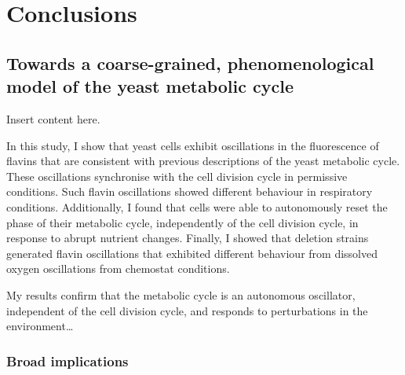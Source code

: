 \chapter{Conclusions}
\label{ch:concl}

\section{Towards a coarse-grained, phenomenological model of the yeast metabolic cycle}
\label{sec:concl-coarse}

Insert content here.


In this study, I show that yeast cells exhibit oscillations in the fluorescence of flavins that are consistent with previous descriptions of the yeast metabolic cycle.
These oscillations synchronise with the cell division cycle in permissive conditions.
Such flavin oscillations showed different behaviour in respiratory conditions.
Additionally, I found that cells were able to autonomously reset the phase of their metabolic cycle, independently of the cell division cycle, in response to abrupt nutrient changes.
Finally, I showed that deletion strains generated flavin oscillations that exhibited different behaviour from dissolved oxygen oscillations from chemostat conditions.

My results confirm that the metabolic cycle is an autonomous oscillator, independent of the cell division cycle, and responds to perturbations in the environment\ldots{}

\subsection{Broad implications}
\label{sec:biology-discussion-implications}

